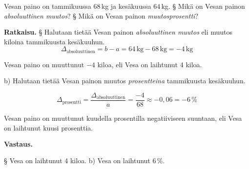\begin{esimerkki}
    Vesan paino on tammikuussa $68$\,kg ja kesäkuussa $64$\,kg.
    \newline
§ Mikä on Vesan painon \textit{absoluuttinen muutos}?
    \newline
§ Mikä on Vesan painon \textit{muutosprosentti}?
    
    \textbf{Ratkaisu.}
§ Halutaan tietää Vesan painon \textit{absoluuttinen muutos} eli muutos kiloina tammikuusta kesäkuuhun.
    \[
       \Delta_{\text{absoluuttinen}} = b - a = 64\,\text{kg} - 68\,\text{kg} = -4\,\text{kg}
    \]

    Vesan paino on muuttunut $-4$ kiloa, eli Vesa on laihtunut 4 kiloa.

b) Halutaan tietää Vesan painon muutos \textit{prosentteina} tammikuusta kesäkuuhun.
    
    \[
        \Delta_{\text{prosentti}}
        = \frac{\Delta_{\text{absoluuttinen}}}{a}
        = \frac{-4}{68}
        \approx -0,06
        = -6\,\% 
    \]
    
    Vesan paino on muuttunut kuudella prosentilla negatiiviseen suuntaan,
    eli Vesa on laihtunut kuusi prosenttia.
    
    \textbf{Vastaus.}
    
§ Vesa on laihtunut 4 kiloa.
b) Vesa on laihtunut $6\,\%$.
\end{esimerkki}

    
